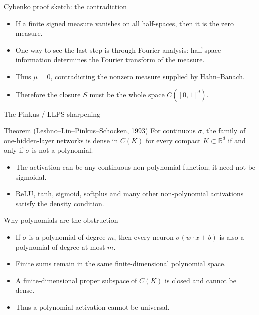 \documentclass[aspectratio=43,11pt]{beamer}
\newcommand{\slideid}{L2}
\newenvironment{slideitems}{\small\begin{itemize}\setlength\itemsep{0.45em}}{\end{itemize}}
\begin{document}
\renewcommand{\slideid}{L2-S25}
\begin{frame}[t]{Cybenko proof sketch: the contradiction}
\begin{slideitems}
\item If a finite signed measure vanishes on all half-spaces, then it is the zero measure.
\item One way to see the last step is through Fourier analysis: half-space information determines the Fourier transform of the measure.
\item Thus $\mu=0$, contradicting the nonzero measure supplied by Hahn--Banach.
\item Therefore the closure $S$ must be the whole space $C([0,1]^d)$.
\end{slideitems}
\end{frame}

\renewcommand{\slideid}{L2-S26}
\begin{frame}[t]{The Pinkus / LLPS sharpening}
\begin{block}{Theorem (Leshno--Lin--Pinkus--Schocken, 1993)}
For continuous $\sigma$, the family of one-hidden-layer networks is dense in $C(K)$ for every compact $K\subset\mathbb R^d$ if and only if $\sigma$ is not a polynomial.
\end{block}
\begin{slideitems}
\item The activation can be any continuous non-polynomial function; it need not be sigmoidal.
\item ReLU, tanh, sigmoid, softplus and many other non-polynomial activations satisfy the density condition.
\end{slideitems}
\end{frame}

\renewcommand{\slideid}{L2-S27}
\begin{frame}[t]{Why polynomials are the obstruction}
\begin{slideitems}
\item If $\sigma$ is a polynomial of degree $m$, then every neuron $\sigma(w\cdot x+b)$ is also a polynomial of degree at most $m$.
\item Finite sums remain in the same finite-dimensional polynomial space.
\item A finite-dimensional proper subspace of $C(K)$ is closed and cannot be dense.
\item Thus a polynomial activation cannot be universal.
\end{slideitems}
\end{frame}
\end{document}
